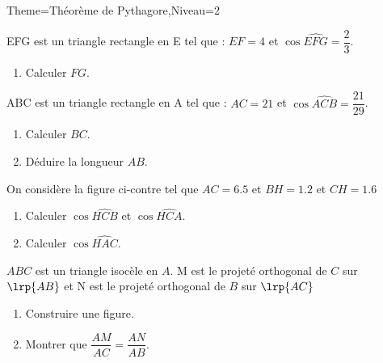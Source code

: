 \documentclass[a4paper,12pt]{article}
\begin{document}
\begin{Maquette}[Fiche]{Theme=Théorème de Pythagore,Niveau=2}
\begin{exercice}
EFG est un triangle rectangle en E tel que : $EF=4$ et $\cos\widehat{EFG}=\dfrac{2}{3}$.
\begin{enumerate}
\item Calculer $FG$.
\end{enumerate}
\end{exercice}

\begin{exercice}
ABC est un triangle rectangle en A tel que : $AC=21$ et $\cos\widehat{ACB}=\dfrac{21}{29}$.
\begin{enumerate}
\item Calculer $BC$.
\item Déduire la longueur $AB$.
\end{enumerate}
\end{exercice}

\begin{exercice}
\begin{minipage}{0.5\linewidth}
On considère la figure ci-contre tel que $AC=6.5$ et $BH=1.2$ et $CH=1.6$
\begin{enumerate}
\item Calculer $\cos\widehat{HCB}$ et $\cos\widehat{HCA}$.
\item Calculer $\cos\widehat{HAC}$.
\end{enumerate}
\end{minipage}%
\begin{minipage}{0.5\linewidth}
\end{minipage}
\end{exercice}

\begin{exercice}
$ABC$ est un triangle isocèle en $A$. M est le projeté orthogonal de $C$ sur $\lrp{AB}$ et N est le projeté orthogonal de $B$ sur $\lrp{AC}$
\begin{enumerate}
\item Construire une figure.
\item Montrer que $\dfrac{AM}{AC}=\dfrac{AN}{AB}$.
\end{enumerate}
\end{exercice}


\end{Maquette}
\end{document}
